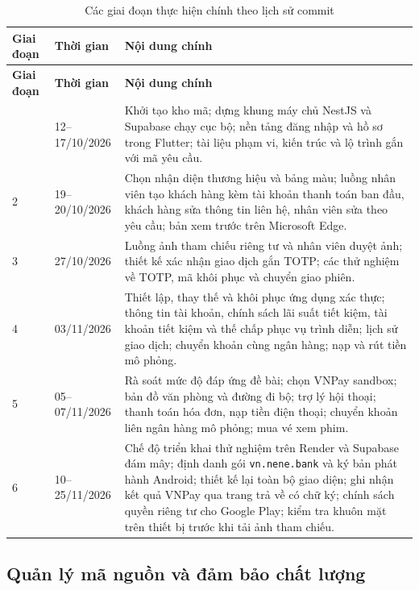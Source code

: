\begingroup
\linespread{1.15}\small
\begin{longtable}{@{}p{1.5cm} p{2.6cm} p{10.5cm}@{}}
	\caption{Các giai đoạn thực hiện chính theo lịch sử commit}
	\label{tab:ch1-tien-do} \\
	\toprule
	\textbf{Giai đoạn} & \textbf{Thời gian} & \textbf{Nội dung chính} \\
	\midrule
	\endfirsthead
	\toprule
	\textbf{Giai đoạn} & \textbf{Thời gian} & \textbf{Nội dung chính} \\
	\midrule
	\endhead
	\bottomrule
	\endfoot
	1 & 12--17/10/2026 & Khởi tạo kho mã; dựng khung máy chủ NestJS và Supabase chạy cục bộ; nền tảng đăng nhập và hồ sơ trong Flutter; tài liệu phạm vi, kiến trúc và lộ trình gắn với mã yêu cầu. \\
	\midrule
	2 & 19--20/10/2026 & Chọn nhận diện thương hiệu và bảng màu; luồng nhân viên tạo khách hàng kèm tài khoản thanh toán ban đầu, khách hàng sửa thông tin liên hệ, nhân viên sửa theo yêu cầu; bản xem trước trên Microsoft Edge. \\
	\midrule
	3 & 27/10/2026 & Luồng ảnh tham chiếu riêng tư và nhân viên duyệt ảnh; thiết kế xác nhận giao dịch gắn TOTP; các thử nghiệm về TOTP, mã khôi phục và chuyển giao phiên. \\
	\midrule
	4 & 03/11/2026 & Thiết lập, thay thế và khôi phục ứng dụng xác thực; thông tin tài khoản, chính sách lãi suất tiết kiệm, tài khoản tiết kiệm và thế chấp phục vụ trình diễn; lịch sử giao dịch; chuyển khoản cùng ngân hàng; nạp và rút tiền mô phỏng. \\
	\midrule
	5 & 05--07/11/2026 & Rà soát mức độ đáp ứng đề bài; chọn VNPay sandbox; bản đồ văn phòng và đường đi bộ; trợ lý hội thoại; thanh toán hóa đơn, nạp tiền điện thoại; chuyển khoản liên ngân hàng mô phỏng; mua vé xem phim. \\
	\midrule
	6 & 10--25/11/2026 & Chế độ triển khai thử nghiệm trên Render và Supabase đám mây; định danh gói \texttt{vn.\allowbreak{}nene.\allowbreak{}bank} và ký bản phát hành Android; thiết kế lại toàn bộ giao diện; ghi nhận kết quả VNPay qua trang trả về có chữ ký; chính sách quyền riêng tư cho Google Play; kiểm tra khuôn mặt trên thiết bị trước khi tải ảnh tham chiếu. \\
\end{longtable}
\endgroup

\subsection{Quản lý mã nguồn và đảm bảo chất lượng}

